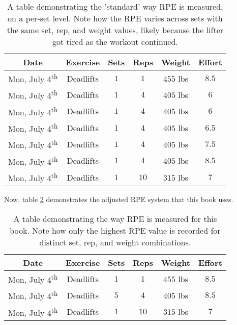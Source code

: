 \begin{table}[h]
	\centering
	\begin{tabular}{c|c|c|c|c|c}
		Date & Exercise & Sets & Reps & Weight & Effort \\
        \hline
        Mon, July 4\textsuperscript{th} & Deadlifts & $1$ & $1$ & $455$ lbs & $8.5$ \\
        Mon, July 4\textsuperscript{th} & Deadlifts & $1$ & $4$ & $405$ lbs & $6$ \\
        Mon, July 4\textsuperscript{th} & Deadlifts & $1$ & $4$ & $405$ lbs & $6$ \\
        Mon, July 4\textsuperscript{th} & Deadlifts & $1$ & $4$ & $405$ lbs & $6.5$ \\
        Mon, July 4\textsuperscript{th} & Deadlifts & $1$ & $4$ & $405$ lbs & $7.5$ \\
        Mon, July 4\textsuperscript{th} & Deadlifts & $1$ & $4$ & $405$ lbs & $8.5$ \\
        Mon, July 4\textsuperscript{th} & Deadlifts & $1$ & $10$ & $315$ lbs & $7$ \\
	\end{tabular}
	\caption{A table demonstrating the 'standard' way RPE is measured, on a per-set level. Note how the RPE varies across sets with the same set, rep, and weight values, likely because the lifter got tired as the workout continued.}
	\label{tab:StandardRPEExample}
\end{table}

Now, table \ref{tab:NonStandardRPEExample} demonstrates the adjusted RPE system that this book uses.

\begin{table}[h]
	\centering
	\begin{tabular}{c|c|c|c|c|c}
		Date & Exercise & Sets & Reps & Weight & Effort \\
        \hline
        Mon, July 4\textsuperscript{th} & Deadlifts & $1$ & $1$ & $455$ lbs & $8.5$ \\
        Mon, July 4\textsuperscript{th} & Deadlifts & $5$ & $4$ & $405$ lbs & $8.5$ \\
        Mon, July 4\textsuperscript{th} & Deadlifts & $1$ & $10$ & $315$ lbs & $7$ \\
	\end{tabular}
	\caption{A table demonstrating the way RPE is measured for this book. Note how only the highest RPE value is recorded for distinct set, rep, and weight combinations.}
	\label{tab:NonStandardRPEExample}
\end{table}

